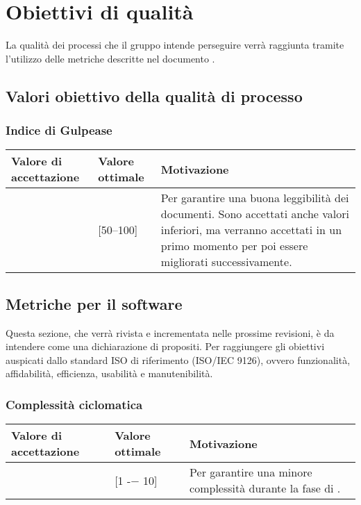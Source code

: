 \newpage

\section{Obiettivi di qualità}
La qualità dei processi che il gruppo \gruppo{} intende perseguire verrà raggiunta tramite l'utilizzo delle metriche descritte nel documento \NdP.


\subsection{Valori obiettivo della qualità di processo}

\subsubsection{Indice di Gulpease}

\begin{center}

		\begin{tabular}{|P{2.5cm}|P{2.5cm}|P{6cm}|}
		\hline
			\textbf{Valore di accettazione}	& \textbf{Valore ottimale} & \textbf{Motivazione} \\
			\hline
			[40 -- 100] & [50--100] &	Per garantire una buona leggibilità dei documenti. Sono accettati anche valori inferiori, ma verranno accettati in un primo momento per poi essere migliorati successivamente. \\
			\hline
			\end{tabular}
\end{center}

\subsection{Metriche per il software}
Questa sezione, che verrà rivista e incrementata nelle prossime revisioni, è da intendere come una dichiarazione di propositi.
Per raggiungere gli obiettivi auspicati dallo standard ISO di riferimento (ISO/IEC 9126), ovvero funzionalità, affidabilità,
efficienza, usabilità e manutenibilità.


\subsubsection{Complessità ciclomatica}

\begin{center}
		\begin{tabular}{|P{2.5cm}|P{2.5cm}|P{6cm}|}
		\hline
			\textbf{Valore di accettazione}	& \textbf{Valore ottimale} & \textbf{Motivazione} \\
			\hline
			[1 -− 15] & [1 -− 10] &	Per garantire una minore complessità durante la fase di \COD. \\
			\hline
			\end{tabular}
\end{center}

